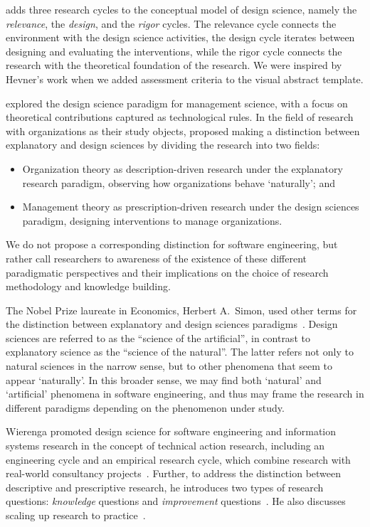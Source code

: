 \documentclass[graybox]{svmult}
\newcommand{\peggy}[1]{\textcolor{blue}{{\it [Peggy says: #1]}}}
\newcommand{\peggy}[1]{}
\begin{document}
\cite{Hevner2007} adds three research cycles to the conceptual model of design science, namely the \emph{relevance}, the \emph{design}, and the \emph{rigor} cycles. The relevance cycle connects the environment with the design science activities, the design cycle iterates between designing and evaluating the interventions, while the rigor cycle connects the research with the theoretical foundation of the research. We were inspired by Hevner's work when we added assessment criteria to the visual abstract template.


\cite{van_aken_management_2005} explored the design science paradigm for management science, with a focus on theoretical contributions captured as technological rules. 
In the field of research with organizations as their study objects, \cite{van_aken_management_2004} proposed making a distinction between explanatory and design sciences by dividing the research into two fields: 
\begin{itemize}
\item Organization theory as description-driven research under the explanatory research paradigm, observing how organizations behave `naturally'; and 
\item Management theory as prescription-driven research under the design sciences paradigm, designing interventions to manage organizations.  
\end{itemize}

We do not propose a corresponding distinction for software engineering, but rather call researchers to awareness of the existence of these different paradigmatic perspectives and their implications on the choice of research methodology and knowledge building.

The Nobel Prize laureate in Economics, Herbert A.\ Simon, used other terms for the distinction between explanatory and design sciences paradigms~\citep{Simons69}. Design sciences are referred to as the ``science of the artificial'', in contrast to explanatory science as the ``science of the natural''. The latter refers not only to natural sciences in the narrow sense, but to other phenomena that seem to appear `naturally'. In this broader sense, we may find both `natural' and `artificial' phenomena in software engineering, and thus may frame the research in different paradigms depending on the phenomenon under study. 


Wierenga promoted design science for software engineering and information systems research in the concept of technical action research, including an engineering cycle and an empirical research cycle, which combine research with real-world consultancy projects~\citep{wieringa_six_2015,wieringa_technical_2012,wieringa_what_2014}. Further, to address the distinction between descriptive and prescriptive research, he introduces two types of research questions: \emph{knowledge} questions and \emph{improvement} questions~\citep{wieringa_design_2009}. He also discusses scaling up research to practice~\citep{Wieringa2014}. 
\end{document}
